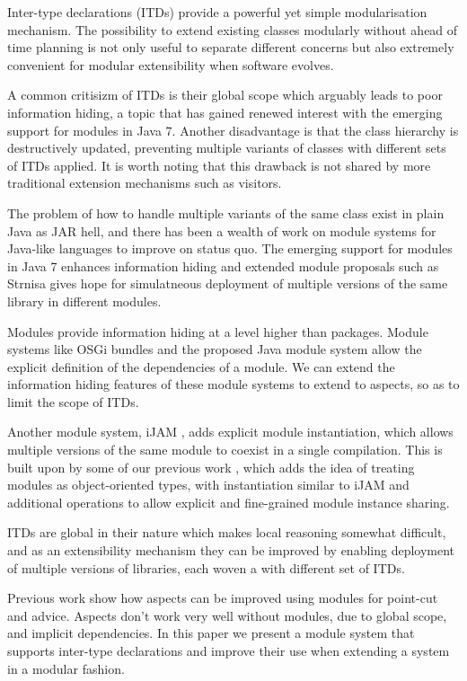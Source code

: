 Inter-type declarations (ITDs) provide a powerful yet simple modularisation
mechanism. The possibility to extend existing classes modularly without
ahead of time planning is not only useful to separate different concerns
but also extremely convenient for modular extensibility when software
evolves.

A common critisizm of ITDs is their global scope which arguably leads to
poor information hiding, a topic that has gained renewed interest with the 
emerging support for modules in Java 7. Another disadvantage is that the 
class hierarchy is destructively updated, preventing multiple variants of 
classes with different sets of ITDs applied. It is worth noting that 
this drawback is not shared by more traditional extension mechanisms such 
as visitors.

The problem of how to handle multiple variants of the same class exist in plain
Java as JAR hell, and there has been a wealth of work on module systems for Java-like
languages to improve on status quo. The emerging support for modules in Java 7 enhances information hiding and
extended module proposals such as Strnisa gives hope for simulatneous
deployment of multiple versions of the same library in different modules.

Modules provide information hiding at a level higher than packages. Module
systems like OSGi bundles\cite{OSGi4} and the proposed Java module system\cite{JSR277}
allow the explicit definition of the dependencies of a module. We can extend
the information hiding features of these module systems to extend to aspects, 
so as to limit the scope of ITDs.

Another module system, iJAM \cite{iJAM}, adds explicit module instantiation, 
which allows multiple versions of the same module to coexist in a single compilation.
This is built upon by some of our previous work \cite{modulesastypes}, which 
adds the idea of treating modules as object-oriented types, with instantiation
similar to iJAM and additional operations to allow explicit and fine-grained
module instance sharing. 

ITDs are global in their nature which makes local
reasoning somewhat difficult, and as an extensibility mechanism they can be
improved by enabling deployment of multiple versions of libraries, 
each woven a with different set of ITDs.


Previous work show how aspects can be improved using modules for point-cut
and advice.
Aspects don't work very well without modules, due to global scope, and
implicit dependencies.
In this paper we present a module system that supports inter-type
declarations and improve their use when extending a system in a modular
fashion.

